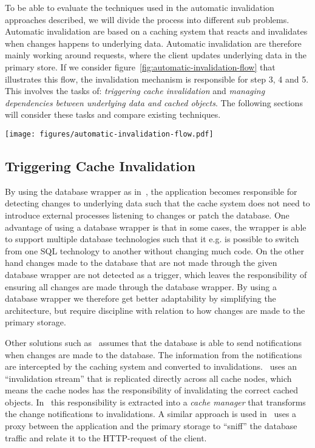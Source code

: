 To be able to evaluate the techniques used in the automatic invalidation approaches described, we will divide the process into different sub problems. Automatic invalidation are based on a caching system that reacts and invalidates when changes happens to underlying data. Automatic invalidation are therefore mainly working around requests, where the client updates underlying data in the primary store. If we consider figure~\ref{fig:automatic-invalidation-flow} that illustrates this flow, the invalidation mechanism is responsible for step 3, 4 and 5. This involves the tasks of: \emph{triggering cache invalidation} and \emph{managing dependencies between underlying data and cached objects}. The following sections will consider these tasks and compare existing techniques.

\begin{figure*}[ht!]
  \centering
  \texttt{[image: figures/automatic-invalidation-flow.pdf]}
  \caption{The control flow of automatic invalidation when a client requests to update underlying data}
  \label{fig:automatic-invalidation-flow}
\end{figure*}

\subsection{Triggering Cache Invalidation}
\label{subsubsec:triggering-cache-invalidation}

By using the database wrapper as in~\cite{paper:cache-genie, paper:deploy-time}, the application becomes responsible for detecting changes to underlying data such that the cache system does not need to introduce external processes listening to changes or patch the database. One advantage of using a database wrapper is that in some cases, the wrapper is able to support multiple database technologies such that it e.g. is possible to switch from one SQL technology to another without changing much code. On the other hand changes made to the database that are not made through the given database wrapper are not detected as a trigger, which leaves the responsibility of ensuring all changes are made through the database wrapper. By using a database wrapper we therefore get better adaptability by simplifying the architecture, but require discipline with relation to how changes are made to the primary storage.

Other solutions such as~\cite{paper:liskov, paper:ibm, paper:ibm-extended} assumes that the database is able to send notifications when changes are made to the database. The information from the notifications are intercepted by the caching system and converted to invalidations.~\cite{paper:liskov} uses an ``invalidation stream'' that is replicated directly across all cache nodes, which means the cache nodes has the responsibility of invalidating the correct cached objects. In~\cite{paper:ibm, paper:ibm-extended} this responsibility is extracted into a \emph{cache manager} that transforms the change notifications to invalidations. A similar approach is used in~\cite{paper:db-driven-http} uses a proxy between the application and the primary storage to ``sniff'' the database traffic and relate it to the HTTP-request of the client.

